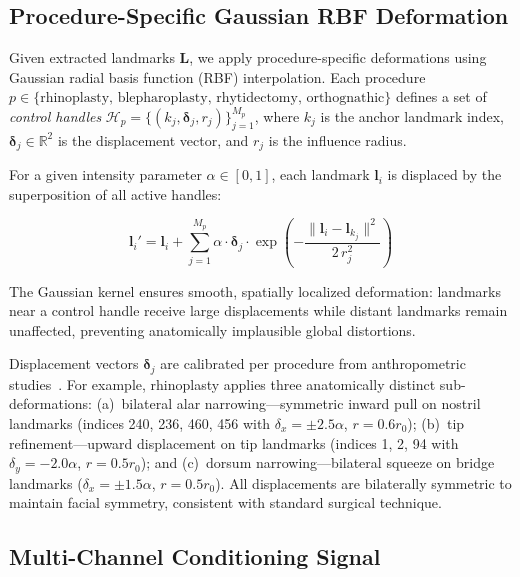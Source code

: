 \documentclass[runningheads]{llncs}
\newcommand{\RR}{\mathbb{R}}
\begin{document}
\subsection{Procedure-Specific Gaussian RBF Deformation}
\label{sec:deformation}

Given extracted landmarks $\mathbf{L}$, we apply procedure-specific
deformations using Gaussian radial basis function (RBF) interpolation.
Each procedure $p \in \{\text{rhinoplasty, blepharoplasty, rhytidectomy,
orthognathic}\}$ defines a set of \emph{control handles}
$\mathcal{H}_p = \{(k_j, \boldsymbol{\delta}_j, r_j)\}_{j=1}^{M_p}$,
where $k_j$ is the anchor landmark index, $\boldsymbol{\delta}_j \in
\RR^2$ is the displacement vector, and $r_j$ is the influence radius.

For a given intensity parameter $\alpha \in [0, 1]$, each landmark
$\mathbf{l}_i$ is displaced by the superposition of all active handles:

\begin{equation}
\label{eq:rbf}
\mathbf{l}_i' = \mathbf{l}_i + \sum_{j=1}^{M_p} \alpha \cdot
\boldsymbol{\delta}_j \cdot \exp\!\left(
-\frac{\|\mathbf{l}_i - \mathbf{l}_{k_j}\|^2}{2\,r_j^2}
\right)
\end{equation}

The Gaussian kernel ensures smooth, spatially localized deformation:
landmarks near a control handle receive large displacements while distant
landmarks remain unaffected, preventing anatomically implausible global
distortions.

Displacement vectors $\boldsymbol{\delta}_j$ are calibrated per procedure
from anthropometric studies~\cite{singh2010plastic}.  For example,
rhinoplasty applies three anatomically distinct sub-deformations:
(a)~bilateral alar narrowing---symmetric inward pull on nostril landmarks
(indices 240, 236, 460, 456 with $\delta_x = \pm 2.5\alpha$, $r = 0.6r_0$);
(b)~tip refinement---upward displacement on tip landmarks (indices 1, 2,
94 with $\delta_y = -2.0\alpha$, $r = 0.5r_0$); and (c)~dorsum
narrowing---bilateral squeeze on bridge landmarks ($\delta_x = \pm
1.5\alpha$, $r = 0.5r_0$).  All displacements are bilaterally symmetric
to maintain facial symmetry, consistent with standard surgical technique.

\subsection{Multi-Channel Conditioning Signal}
\label{sec:conditioning}
\end{document}
